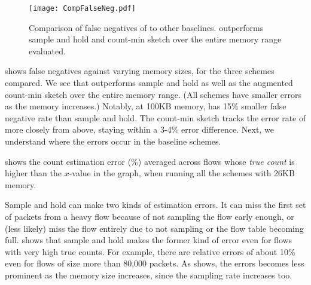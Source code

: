 \begin{figure}[h]
\texttt{[image: CompFalseNeg.pdf]}
\caption{Comparison of false negatives of \TheSystem to other
  baselines. \TheSystem outperforms sample and hold and count-min sketch over
  the entire memory range evaluated.}
\label{fig:FalseNegvsMSchemes}
\end{figure}


  shows false negatives
against varying memory sizes, for the three schemes compared. We see that
\TheSystem outperforms sample and hold as well as the augmented count-min sketch
over the entire memory range. (All schemes have smaller errors as the memory
increases.) Notably, at 100KB memory, \TheSystem has 15\% smaller false negative
rate than sample and hold. The count-min sketch tracks the error rate of
\TheSystem more closely from above, staying within a 3-4\% error
difference. Next, we understand where the errors occur in the baseline schemes.

 
shows the count estimation error (\%) averaged across flows whose {\em true
  count} is higher than the $x$-value in the graph, when running all the schemes
with 26KB memory.

Sample and hold can make two kinds of estimation errors. It can miss the first
set of packets from a heavy flow because of not sampling the flow early enough,
or (less likely) miss the flow entirely due to not sampling or the flow table
becoming full.  shows that sample and hold makes
the former kind of error even for flows with very high true counts. For
example, there are relative errors of about 10\% even for flows of size more
than 80,000 packets. As  shows, the errors becomes less
prominent as the memory size increases, since the sampling rate increases too.

